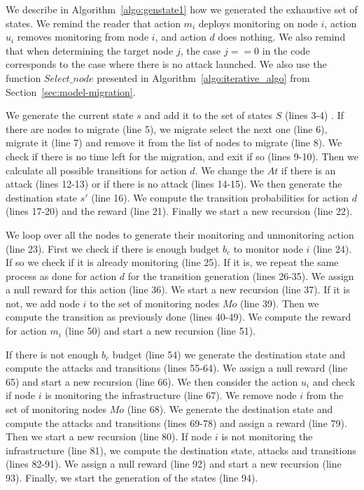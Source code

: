 We describe in Algorithm~\ref{algo:genstate1} how we generated the exhaustive set of states.
We remind the reader that action $m_i$ deploys monitoring on node $i$, action $u_i$ removes monitoring from node $i$, and action $d$ does nothing.
We also remind that when determining the target node $j$, the case $j==0$ in the code corresponds to the case where there is no attack launched.
We also use the function $Select\_node$ presented in Algorithm~\ref{algo:iterative_algo} from Section~\ref{sec:model-migration}.

We generate the current state $s$ and add it to the set of states $S$ (lines 3-4) .
If there are nodes to migrate (line 5), we migrate select the next one (line 6), migrate it (line 7) and remove it from the list of nodes to migrate (line 8).
We check if there is no time left for the migration, and exit if so (lines 9-10).
Then we calculate all possible transitions for action $d$.
We change the $At$ if there is an attack (lines 12-13) or if there is no attack (lines 14-15).
We then generate the destination state $s'$ (line 16).
We compute the transition probabilities for action $d$ (lines 17-20) and the reward (line 21).
Finally we start a new recursion (line 22).

We loop over all the nodes to generate their monitoring and unmonitoring action (line 23).
First we check if there is enough budget $b_c$ to monitor node $i$ (line 24).
If so we check if it is already monitoring (line 25).
If it is, we repeat the same process as done for action $d$ for the transition generation (lines 26-35).
We assign a null reward for this action (line 36).
We start a new recursion (line 37).
If it is not, we add node $i$ to the set of monitoring nodes $Mo$ (line 39).
Then we compute the transition as previously done (lines 40-49).
We compute the reward for action $m_i$ (line 50) and start a new recursion (line 51).

If there is not enough $b_c$ budget (line 54) we generate the destination state and compute the attacks and  transitions (lines 55-64).
We assign a null reward (line 65) and start a new recursion (line 66).
We then consider the action $u_i$ and check if node $i$ is monitoring the infrastructure (line 67). 
We remove node $i$ from the set of monitoring nodes $Mo$ (line 68).
We generate the destination state and compute the attacks and transitions (lines 69-78) and assign a reward (line 79).
Then we start a new recursion (line 80).
If node $i$ is not monitoring the infrastructure (line 81), we compute the destination state, attacks and transitions (lines 82-91).
We assign a null reward (line 92) and start a new recursion (line 93).
Finally, we start the generation of the states (line 94).


